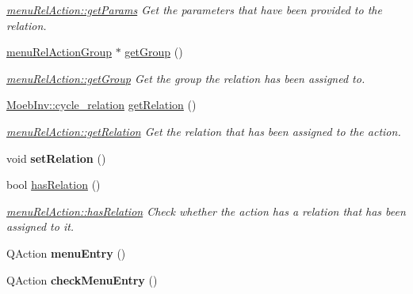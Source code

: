 \begin{DoxyCompactItemize}
\begin{DoxyCompactList}\small\item\em \mbox{\hyperlink{classmenu_rel_action_a8da5cc4f4063d4ea465d67b0aabc57e7}{menu\+Rel\+Action\+::get\+Params}} Get the parameters that have been provided to the relation. \end{DoxyCompactList}\item 
\mbox{\hyperlink{classmenu_rel_action_group}{menu\+Rel\+Action\+Group}} $\ast$ \mbox{\hyperlink{classmenu_rel_action_aca0baeed9c6a266d677dae8dfb25d65b}{get\+Group}} ()
\begin{DoxyCompactList}\small\item\em \mbox{\hyperlink{classmenu_rel_action_aca0baeed9c6a266d677dae8dfb25d65b}{menu\+Rel\+Action\+::get\+Group}} Get the group the relation has been assigned to. \end{DoxyCompactList}\item 
\mbox{\hyperlink{class_moeb_inv_1_1cycle__relation}{Moeb\+Inv\+::cycle\+\_\+relation}} \mbox{\hyperlink{classmenu_rel_action_a34deae132c511b7e34af97585df9245c}{get\+Relation}} ()
\begin{DoxyCompactList}\small\item\em \mbox{\hyperlink{classmenu_rel_action_a34deae132c511b7e34af97585df9245c}{menu\+Rel\+Action\+::get\+Relation}} Get the relation that has been assigned to the action. \end{DoxyCompactList}\item 
\mbox{\label{classmenu_rel_action_acba36fb50f54a72a4b253957f2f50f92}} 
void {\bfseries set\+Relation} ()
\item 
bool \mbox{\hyperlink{classmenu_rel_action_a5e6339dbaf4cf0dc9543afdfc5b9e15a}{has\+Relation}} ()
\begin{DoxyCompactList}\small\item\em \mbox{\hyperlink{classmenu_rel_action_a5e6339dbaf4cf0dc9543afdfc5b9e15a}{menu\+Rel\+Action\+::has\+Relation}} Check whether the action has a relation that has been assigned to it. \end{DoxyCompactList}\item 
\mbox{\label{classmenu_rel_action_af3463f9fd28cf1ff44c672dedb89af95}} 
Q\+Action {\bfseries menu\+Entry} ()
\item 
\mbox{\label{classmenu_rel_action_a9c40a2e1e1538829214a2a9e06896a99}} 
Q\+Action {\bfseries check\+Menu\+Entry} ()

\end{DoxyCompactItemize}
